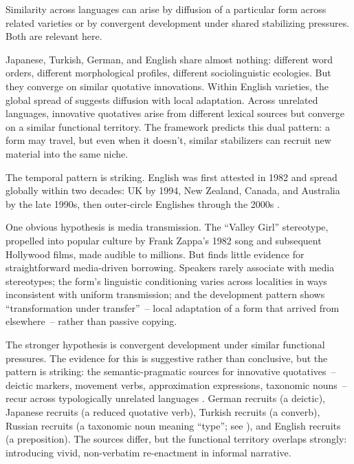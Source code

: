 Similarity across languages can arise by diffusion of a particular form across related varieties or by convergent development under shared stabilizing pressures. Both are relevant here.

Japanese, Turkish, German, and English share almost nothing: different word orders, different morphological profiles, different sociolinguistic ecologies. But they converge on similar quotative innovations. Within English varieties, the global spread of  suggests diffusion with local adaptation. Across unrelated languages, innovative quotatives arise from different lexical sources but converge on a similar functional territory. The framework predicts this dual pattern: a form may travel, but even when it doesn't, similar stabilizers can recruit new material into the same niche.

The temporal pattern is striking. English  was first attested in 1982 \autocite{butters1982} and spread globally within two decades: UK by 1994, New Zealand, Canada, and Australia by the late 1990s, then outer-circle Englishes through the 2000s \autocite{buchstaller2014}.

One obvious hypothesis is media transmission. The \enquote{Valley Girl} stereotype, propelled into popular culture by Frank Zappa's 1982 song and subsequent Hollywood films, made  audible to millions. But \textcite{buchstaller2014} finds little evidence for straightforward media-driven borrowing. Speakers rarely associate  with media stereotypes; the form's linguistic conditioning varies across localities in ways inconsistent with uniform transmission; and the development pattern shows \enquote{transformation under transfer}~-- local adaptation of a form that arrived from elsewhere~-- rather than passive copying.

The stronger hypothesis is convergent development under similar functional pressures. The evidence for this is suggestive rather than conclusive, but the pattern is striking: the semantic-pragmatic sources for innovative quotatives~-- deictic markers, movement verbs, approximation expressions, taxonomic nouns~-- recur across typologically unrelated languages \autocite{guldemann2008}. German recruits  (a deictic), Japanese recruits  (a reduced quotative verb), Turkish recruits  (a converb), Russian recruits  (a taxonomic noun meaning \enquote{type}; see \citealt{kolyaseva2018tipa}), and English recruits  (a preposition). The sources differ, but the functional territory overlaps strongly: introducing vivid, non-verbatim re-enactment in informal narrative.

